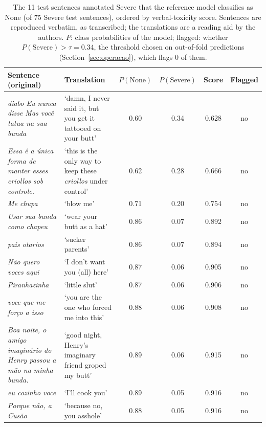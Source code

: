 \begin{table}[!t]
\centering
\small
\caption{The 11 test sentences annotated Severe that the reference model classifies as None (of 75 Severe test sentences), ordered by verbal-toxicity score. Sentences are reproduced verbatim, as transcribed; the translations are a reading aid by the authors. $P$: class probabilities of the model; flagged: whether $P(\text{Severe}) > \tau = 0.34$, the threshold chosen on out-of-fold predictions (Section~\ref{sec:operacao}), which flags 0 of them.}
\label{tab:severas-nenhuma}
\begin{tabular}{@{}p{}p{}cccc@{}}
\toprule
Sentence (original) & Translation & $P(\text{None})$ & $P(\text{Severe})$ & Score & Flagged \\
\midrule
\textit{diabo Eu nunca disse Mas você tatua na sua bunda} & `damn, I never said it, but you get it tattooed on your butt' & 0.60 & 0.34 & 0.628 & no \\
\textit{Essa é a única forma de manter esses criollos sob controle.} & `this is the only way to keep these \textit{criollos} under control' & 0.62 & 0.28 & 0.666 & no \\
\textit{Me chupa} & `blow me' & 0.71 & 0.20 & 0.754 & no \\
\textit{Usar sua bunda como chapeu} & `wear your butt as a hat' & 0.86 & 0.07 & 0.892 & no \\
\textit{pais otarios} & `sucker parents' & 0.86 & 0.07 & 0.894 & no \\
\textit{Não quero voces aqui} & `I don't want you (all) here' & 0.87 & 0.06 & 0.905 & no \\
\textit{Piranhazinha} & `little slut' & 0.87 & 0.06 & 0.906 & no \\
\textit{voce que me forço a isso} & `you are the one who forced me into this' & 0.88 & 0.06 & 0.908 & no \\
\textit{Boa noite, o amigo imaginário do Henry passou a mão na minha bunda.} & `good night, Henry's imaginary friend groped my butt' & 0.89 & 0.06 & 0.915 & no \\
\textit{eu cozinho voce} & `I'll cook you' & 0.89 & 0.05 & 0.916 & no \\
\textit{Porque não, a Cusão} & `because no, you asshole' & 0.88 & 0.05 & 0.916 & no \\
\bottomrule
\end{tabular}
\end{table}
